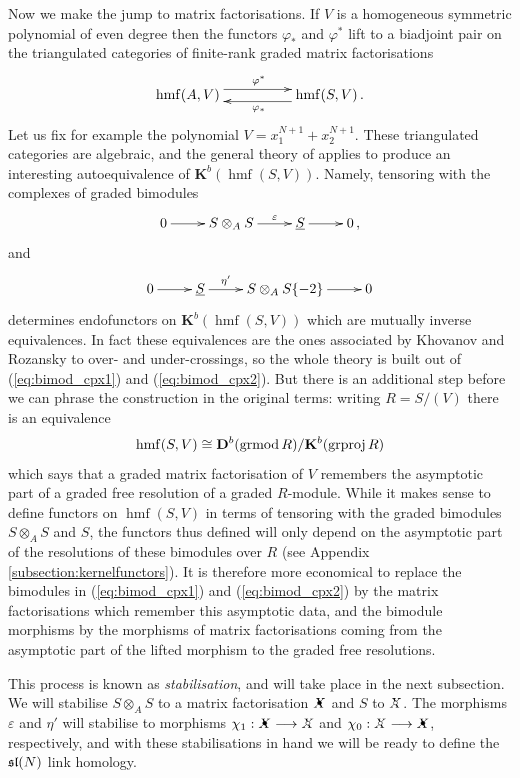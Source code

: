 \documentclass{compositio}
\theoremstyle{definition}
\numberwithin{equation}{section}
\def\K{\mathbf{K}}
\DeclareMathOperator{\hmf}{hmf}
\begin{document}
Now we make the jump to matrix factorisations. If $V$ is a homogeneous symmetric polynomial of even degree then the functors $\varphi_*$ and $\varphi^*$ lift to a biadjoint pair on the triangulated categories of finite-rank graded matrix factorisations
\[
\xymatrix@C+2pc{
\hmf(A, V) \ar@<1ex>[r]^{\varphi^*} & \hmf(S, V) \ar@<1ex>[l]^{\varphi_*} \, .
}
\]
Let us fix for example the polynomial $V = x_1^{N+1} + x_2^{N+1}$. These triangulated categories are algebraic, and the general theory of \cite{RouquierMexico,rickard} applies to produce an interesting autoequivalence of $\K^b( \hmf(S, V) )$. Namely, tensoring with the complexes of graded bimodules
\begin{equation}\label{eq:bimod_cpx1}
\xymatrix{
0 \ar[r] & S \otimes_A S \ar[r]^-{\varepsilon} & \underline{S} \ar[r] & 0 \, ,
}
\end{equation}
and
\begin{equation}\label{eq:bimod_cpx2}
\xymatrix{
0 \ar[r] & \underline{S} \ar[r]^-{\eta'} & S \otimes_A S\{-2\} \ar[r] & 0
}
\end{equation}
determines endofunctors on $\K^b( \hmf(S, V) )$ which are mutually inverse equivalences. In fact these equivalences are the ones associated by Khovanov and Rozansky to over- and under-crossings, so the whole theory is built out of (\ref{eq:bimod_cpx1}) and (\ref{eq:bimod_cpx2}). But there is an additional step before we can phrase the construction in the original terms: writing $R = S/(V)$ there is an equivalence
\[
\hmf(S, V) \cong \qderu{b}{\textup{grmod}\, R}/\K^b(\textup{grproj}\, R)
\]
which says that a graded matrix factorisation of $V$ remembers the asymptotic part of a graded free resolution of a graded $R$-module. While it makes sense to define functors on $\hmf(S,V)$ in terms of tensoring with the graded bimodules $S \otimes_A S$ and $S$, the functors thus defined will only depend on the asymptotic part of the resolutions of these bimodules over $R$ (see Appendix \ref{subsection:kernelfunctors}). It is therefore more economical to replace the bimodules in (\ref{eq:bimod_cpx1}) and (\ref{eq:bimod_cpx2}) by the matrix factorisations which remember this asymptotic data, and the bimodule morphisms by the morphisms of matrix factorisations coming from the asymptotic part of the lifted morphism to the graded free resolutions.

This process is known as \emph{stabilisation}, and will take place in the next subsection. We will stabilise $S \otimes_A S$ to a matrix factorisation $\Xbul$ and $S$ to $\Xcirc$. The morphisms $\varepsilon$ and $\eta'$ will stabilise to morphisms $\chi_1: \Xbul \lto \Xcirc$ and $\chi_0: \Xcirc \lto \Xbul$, respectively, and with these stabilisations in hand we will be ready to define the $\mathfrak{sl}(N)$ link homology.
\end{document}

